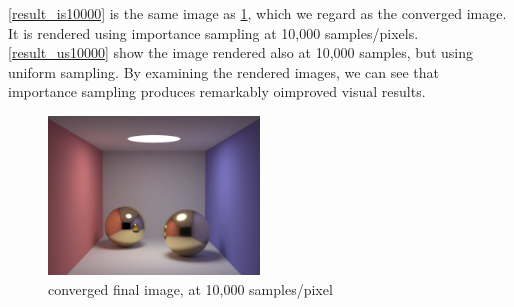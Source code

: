 \documentclass[12pt]{article}
\begin{document}
\cref{result_is10000} is the same image as \ref{result_converged}, which we regard as the converged image.
It is rendered using importance sampling at 10,000 samples/pixels.
\cref{result_us10000} show the image rendered also at 10,000 samples, but using uniform sampling.
By examining the rendered images, we can see that importance sampling produces remarkably oimproved visual results.

\begin{figure}[ht]
  \centering
  \includegraphics[width=0.5\textwidth]{convergedIS.png}
  \caption{converged final image, at 10,000 samples/pixel}
  \label{result_converged}
\end{figure}
\end{document}
